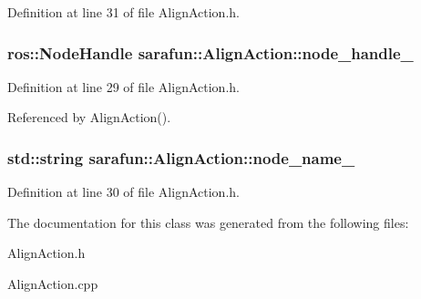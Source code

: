 Definition at line 31 of file Align\-Action.\-h.

\hypertarget{classsarafun_1_1AlignAction_acd1525d3ad1ad220e91af0c58802b6cf_acd1525d3ad1ad220e91af0c58802b6cf}{
\subsubsection[{node\-\_\-handle\-\_\-}]{\setlength{\rightskip}{0pt plus 5cm}ros\-::\-Node\-Handle sarafun\-::\-Align\-Action\-::node\-\_\-handle\-\_\-\hspace{0.3cm}{\ttfamily [private]}}}\label{classsarafun_1_1AlignAction_acd1525d3ad1ad220e91af0c58802b6cf_acd1525d3ad1ad220e91af0c58802b6cf}


Definition at line 29 of file Align\-Action.\-h.



Referenced by Align\-Action().

\hypertarget{classsarafun_1_1AlignAction_a4759b5ee1ef49d647eedcd8d04288799_a4759b5ee1ef49d647eedcd8d04288799}{
\subsubsection[{node\-\_\-name\-\_\-}]{\setlength{\rightskip}{0pt plus 5cm}std\-::string sarafun\-::\-Align\-Action\-::node\-\_\-name\-\_\-\hspace{0.3cm}{\ttfamily [private]}}}\label{classsarafun_1_1AlignAction_a4759b5ee1ef49d647eedcd8d04288799_a4759b5ee1ef49d647eedcd8d04288799}


Definition at line 30 of file Align\-Action.\-h.



The documentation for this class was generated from the following files\-:\begin{DoxyCompactItemize}
\item 
Align\-Action.\-h\item 
Align\-Action.\-cpp\end{DoxyCompactItemize}
